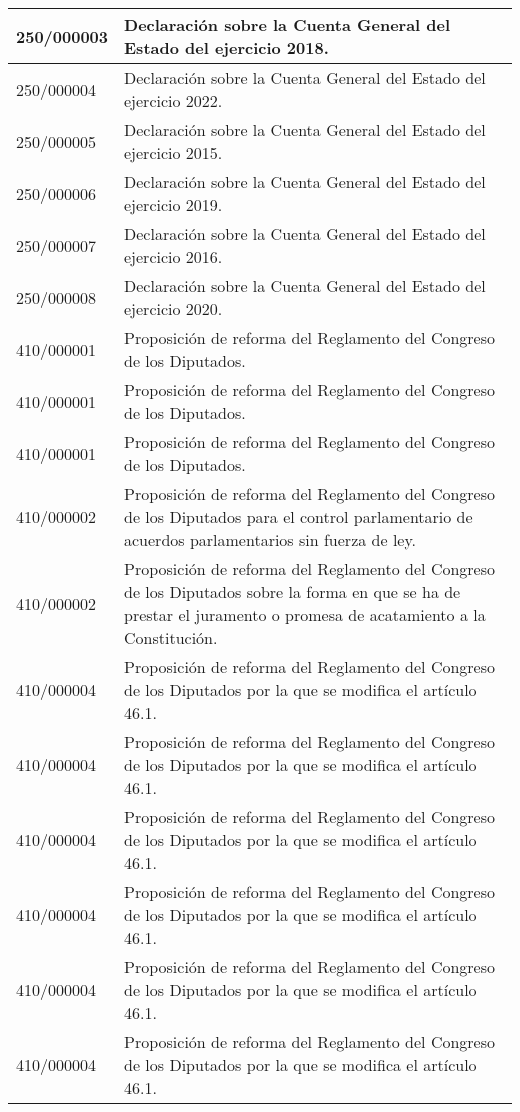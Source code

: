 {\begin{table}[H]
\begin{center}
\begin{tabularx}{\linewidth}{| l | X |}
\hline
250/000003 & Declaración sobre la Cuenta General del Estado del ejercicio 2018. \\
\hline
250/000004 & Declaración sobre la Cuenta General del Estado del ejercicio 2022. \\
\hline
250/000005 & Declaración sobre la Cuenta General del Estado del ejercicio 2015. \\
\hline
250/000006 & Declaración sobre la Cuenta General del Estado del ejercicio 2019. \\
\hline
250/000007 & Declaración sobre la Cuenta General del Estado del ejercicio 2016. \\
\hline
250/000008 & Declaración sobre la Cuenta General del Estado del ejercicio 2020. \\
\hline
410/000001 & Proposición de reforma del Reglamento del Congreso de los Diputados. \\
\hline
410/000001 & Proposición de reforma del Reglamento del Congreso de los Diputados. \\
\hline
410/000001 & Proposición de reforma del Reglamento del Congreso de los Diputados. \\
\hline
410/000002 & Proposición de reforma del Reglamento del Congreso de los Diputados para el control parlamentario de acuerdos parlamentarios sin fuerza de ley. \\
\hline
410/000002 & Proposición de reforma del Reglamento del Congreso de los Diputados sobre la forma en que se ha de prestar el juramento o promesa de acatamiento a la Constitución. \\
\hline
410/000004 & Proposición de reforma del Reglamento del Congreso de los Diputados por la que se modifica el artículo 46.1. \\
\hline
410/000004 & Proposición de reforma del Reglamento del Congreso de los Diputados por la que se modifica el artículo 46.1. \\
\hline
410/000004 & Proposición de reforma del Reglamento del Congreso de los Diputados por la que se modifica el artículo 46.1. \\
\hline
410/000004 & Proposición de reforma del Reglamento del Congreso de los Diputados por la que se modifica el artículo 46.1. \\
\hline
410/000004 & Proposición de reforma del Reglamento del Congreso de los Diputados por la que se modifica el artículo 46.1. \\
\hline
410/000004 & Proposición de reforma del Reglamento del Congreso de los Diputados por la que se modifica el artículo 46.1. \\

\end{tabularx}
\end{center}
\end{table}}
